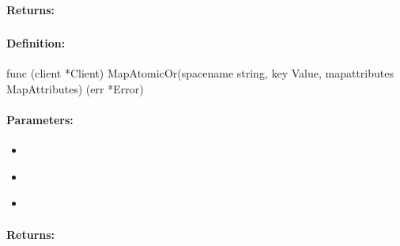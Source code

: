 \paragraph{Returns:}


\pagebreak
\subsubsection{}
\label{api:Go:MapAtomicOr}


\paragraph{Definition:}
\begin{gocode}
func (client *Client) MapAtomicOr(spacename string, key Value, mapattributes MapAttributes) (err *Error)
\end{gocode}

\paragraph{Parameters:}
\begin{itemize}[noitemsep]
\item {}\\

\item {}\\

\item {}\\

\end{itemize}

\paragraph{Returns:}


\pagebreak
\subsubsection{}
\label{api:Go:CondMapAtomicOr}


